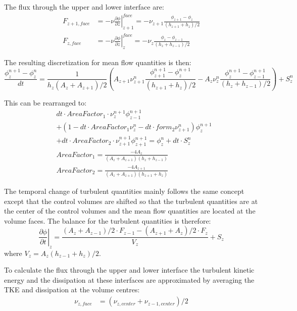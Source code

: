 \documentclass[paper=a4, fontsize=12pt]{article}
\begin{document}
The flux through the upper and lower interface are:
\begin{align}
	F_{z+1,face} &= -\nu\left.\frac{\partial \phi}{\partial z}\right|_{z+1}^{face} = -\nu_{z+1}\frac{\phi_{z+1}-\phi_{z}}{(h_{z+1}+h_{z})/2} \\
	F_{z,face} &= -\nu\left.\frac{\partial \phi}{\partial z}\right|_{z}^{face} = -\nu_z\frac{\phi_{z}-\phi_{z-1}}{(h_{z}+h_{z-1})/2}
\end{align}

\noindent The resulting discretization for mean flow quantities is then:
\begin{equation}
	\frac{\phi^{n+1}_z-\phi^n_z}{dt} = \frac{1}{h_z\left(A_z+A_{z+1}\right)/2}
	\left(A_{z+1}\nu^{n}_{z+1}\frac{\phi^{n+1}_{z+1}-\phi^{n+1}_{z}}{(h_{z+1}+h_{z})/2}-A_{z}\nu^{n}_z\frac{\phi^{n+1}_{z}-\phi^{n+1}_{z-1}}{(h_{z}+h_{z-1})/2}
	\right)+S^n_z 
\end{equation}

\noindent This can be rearranged to:
\begin{align}
	&dt\cdot AreaFactor_1\cdot\nu^{n+1}_z\phi^{n+1}_{z-1}\nonumber\\
	&+(1-dt\cdot AreaFactor_1\nu^{n}_z-dt\cdot form_2\nu^{n}_{z+1})\phi^{n+1}_z\nonumber\\
	&+ dt\cdot AreaFactor_2\cdot\nu^{n+1}_{z+1}\phi^{n+1}_{z+1} = \phi^{n}_{z}+dt\cdot S^n_z\\
	&AreaFactor_1 = \frac{-4A_{z}}{\left(A_z+A_{z+1}\right)\left(h_{z}+h_{z-1}\right)}\\
	&AreaFactor_2 = \frac{-4A_{z+1}}{\left(A_z+A_{z+1}\right)\left(h_{z+1}+h_{z}\right)}
\end{align}

The temporal change of turbulent quantities mainly follows the same concept except that the control volumes are shifted so that the turbulent quantities are at the center of the control volumes and the mean flow quantities are located at the volume faces. The balance for the turbulent quantities is therefore:
\begin{equation}
	\left.\frac{\partial\phi}{\partial t}\right|_{z} =
	\frac{\left(A_z+A_{z-1}\right)/2\cdot F_{z-1}-\left(A_{z+1}+A_z\right)/2\cdot F_{z}}{V_z}+S_z
\end{equation}
where $V_z=A_z\left(h_{z-1}+h_{z}\right)/2$.

To calculate the flux through the upper and lower interface the turbulent kinetic energy and the dissipation at these interfaces are approximated by averaging the TKE and dissipation at the volume centres:
\begin{align}
	\nu_{z,face}&=\left(\nu_{z,center}+\nu_{z-1,center}\right)/2 \\
\end{align}
\end{document}
